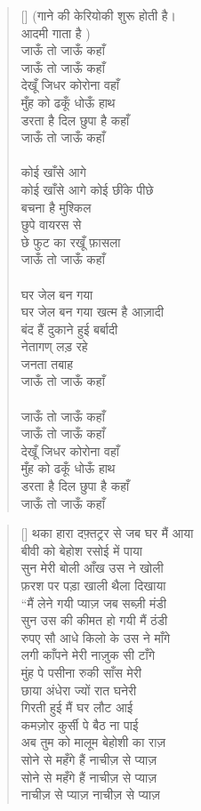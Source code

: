 \begin{verse}[\versewidth]\texthindi{
(गाने की केरियोकी शुरू होती है।\\
आदमी गाता है
)\\
जाऊँ तो जाऊँ कहाँ\\
जाऊँ तो जाऊँ कहाँ\\
देखूँ जिधर कोरोना वहाँ\\
मुँह को ढकूँ धोऊँ हाथ\\
डरता है दिल छुपा है कहाँ\\
जाऊँ तो जाऊँ कहाँ\\
\\
कोई खाँसे आगे\\
कोई खाँसे आगे कोई छींके पीछे\\
बचना है मुश्किल\\
छुपे वायरस से\\
छे फुट का रखूँ फ़ासला\\
जाऊँ तो जाऊँ कहाँ\\
\\
घर जेल बन गया\\
घर जेल बन गया खत्म है आज़ादी\\
बंद हैं दुकाने हुई बर्बादी\\
नेतागण् लड़ रहे\\
जनता तबाह\\
जाऊँ तो जाऊँ कहाँ\\
\\
जाऊँ तो जाऊँ कहाँ\\
जाऊँ तो जाऊँ कहाँ\\
देखूँ जिधर कोरोना वहाँ\\
मुँह को ढकूँ धोऊँ हाथ\\
डरता है दिल छुपा है कहाँ\\
जाऊँ तो जाऊँ कहाँ
}\end{verse}

\begin{verse}[\versewidth]\texthindi{
थका हारा दफ़्तट्रर से जब घर मैं आया\\
बीवी को बेहोश रसोई में पाया\\
सुन मेरी बोली आँख उस ने खोली\\
फ़रश पर पड़ा खाली थैला दिखाया\\
“मैं लेने गयी प्याज़ जब सब्ज़ी मंडी\\
सुन उस की कीमत हो गयी मैं ठंडी\\
रुपए सौ आधे किलो के उस ने माँगे\\
लगी काँपने मेरी नाज़ुक सी टाँगे\\
मुंह पे पसीना रुकी साँस मेरी\\
छाया अंधेरा ज्यों रात घनेरी\\
गिरती हुई मैं घर लौट आई\\
कमज़ोर कुर्सी पे बैठ ना पाई\\
अब तुम को मालूम बेहोशी का राज़\\
सोने से महँगे हैं नाचीज़ से प्याज़\\
सोने से महँगे हैं नाचीज़ से प्याज़\\
नाचीज़ से प्याज़ नाचीज़ से प्याज़
}\end{verse}

